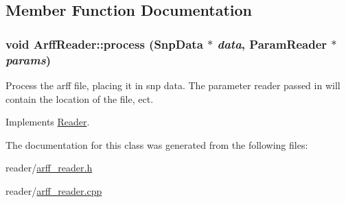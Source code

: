 \subsection{Member Function Documentation}
\hypertarget{classArffReader_af12ed42f6e726a6e336f22381ca84082}{
\subsubsection[{process}]{\setlength{\rightskip}{0pt plus 5cm}void ArffReader::process ({\bf SnpData} $\ast$ {\em data}, \/  {\bf ParamReader} $\ast$ {\em params})}}
\label{classArffReader_af12ed42f6e726a6e336f22381ca84082}
Process the arff file, placing it in snp data. The parameter reader passed in will contain the location of the file, ect. 

Implements \hyperlink{classReader_a334a724f607c84262af67759ffcdbd26}{Reader}.



The documentation for this class was generated from the following files:\begin{DoxyCompactItemize}
\item 
reader/\hyperlink{arff__reader_8h}{arff\_\-reader.h}\item 
reader/\hyperlink{arff__reader_8cpp}{arff\_\-reader.cpp}\end{DoxyCompactItemize}
